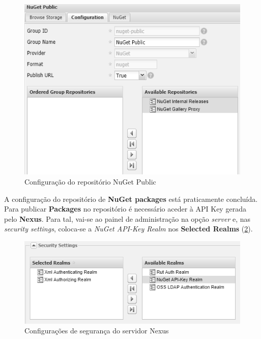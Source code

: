 \begin{figure}[hbt!]
\centering
\includegraphics[width=0.9\linewidth]{Cap5/NexusPublic.png}
\caption{Configuração do repositório NuGet Public}
\label{Fig:Fig41}
\end{figure}

\hspace{1cm}A configuração do repositório de \textbf{NuGet packages} está praticamente concluída. Para publicar \textbf{Packages} no repositório é necessário aceder à API Key gerada pelo \textbf{Nexus}. Para tal, vai-se ao painel de administração na opção \textit{server} e, nas \textit{security settings}, coloca-se a \textit{NuGet API-Key Realm} nos \textbf{Selected Realms} (\ref{Fig:Fig42}).

\begin{figure}[hbt!]
\centering
\includegraphics[width=0.9\linewidth]{Cap5/NexusSecurity.png}
\caption{Configurações de segurança do servidor Nexus}
\label{Fig:Fig42}
\end{figure}

